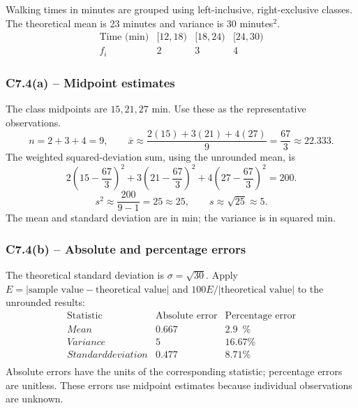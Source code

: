 {
Walking times in minutes are grouped using left-inclusive, right-exclusive classes.
The theoretical mean is 23 minutes and variance is 30 minutes$^2$.
\[
\begin{array}{c|rrr}
\text{Time (min)}&[12,18)&[18,24)&[24,30)\\\hline
f_i&2&3&4
\end{array}
\]
\label{sol:c7-4a}
\subsubsection*{C7.4(a) -- Midpoint estimates }
The class midpoints are $15,21,27$ min. Use these as the representative observations.
\[
n=2+3+4=9,\qquad
\bar{x}\approx\frac{2(15)+3(21)+4(27)}{9}=\frac{67}{3}\approx22.333.
\]
The weighted squared-deviation sum, using the unrounded mean, is
\[
2\left(15-\frac{67}{3}\right)^2+3\left(21-\frac{67}{3}\right)^2+4\left(27-\frac{67}{3}\right)^2=200.
\]
\[
s^2\approx\frac{200}{9-1}=25\approx25,\qquad
s\approx\sqrt{25}\approx5.
\]
The mean and standard deviation are in min; the variance is in squared min.

\label{sol:c7-4b}
\subsubsection*{C7.4(b) -- Absolute and percentage errors }
The theoretical standard deviation is $\sigma=\sqrt{30}$.
Apply $E=|\text{sample value}-\text{theoretical value}|$ and
$100E/|\text{theoretical value}|$ to the unrounded results:
\[
\begin{array}{l|rr}
\text{Statistic}&\text{Absolute error}&\text{Percentage error}\\\hline
Mean&0.667&2.9\phantom{0}\%\\
Variance&5\phantom{.000}&16.67\%\\
Standard deviation&0.477&8.71\%\\
\end{array}
\]
Absolute errors have the units of the corresponding statistic; percentage errors are unitless.
These errors use midpoint estimates because individual observations are unknown.
\secInicio[sec:c7-4]


}

